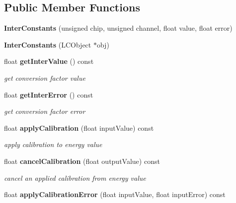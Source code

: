 \subsection*{Public Member Functions}
\begin{DoxyCompactItemize}
\item 
{\bfseries InterConstants} (unsigned chip, unsigned channel, float value, float error)\label{classCALICE_1_1InterConstants_a9130ab502198dc16813f62f591155900}

\item 
{\bfseries InterConstants} (LCObject $\ast$obj)\label{classCALICE_1_1InterConstants_a8275f0285c5080d4024de5557e0d0709}

\item 
float {\bf getInterValue} () const \label{classCALICE_1_1InterConstants_a2da8b23255795109983569198e70bfd7}

\begin{DoxyCompactList}\small\item\em get conversion factor value \item\end{DoxyCompactList}\item 
float {\bf getInterError} () const \label{classCALICE_1_1InterConstants_a17d72b981677ced2bc941119dcd19b2f}

\begin{DoxyCompactList}\small\item\em get conversion factor error \item\end{DoxyCompactList}\item 
float {\bf applyCalibration} (float inputValue) const \label{classCALICE_1_1InterConstants_ac4e54f423b0048db8e79b745a53a5209}

\begin{DoxyCompactList}\small\item\em apply calibration to energy value \item\end{DoxyCompactList}\item 
float {\bf cancelCalibration} (float outputValue) const \label{classCALICE_1_1InterConstants_a2f2d1a18b5136f7e2772d25629b4ccb2}

\begin{DoxyCompactList}\small\item\em cancel an applied calibration from energy value \item\end{DoxyCompactList}\item 
float {\bf applyCalibrationError} (float inputValue, float inputError) const \label{classCALICE_1_1InterConstants_ad102c242709f9229f3936d04bb356be7}


\end{DoxyCompactItemize}
